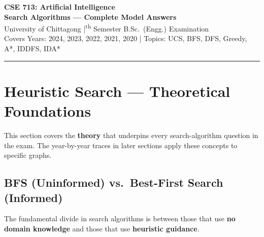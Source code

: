 \documentclass[12pt, a4paper]{article}
\begin{document}

\begin{center}
  {\LARGE\bfseries\color{sectionblue} CSE 713: Artificial Intelligence}\\[0.6em]
  {\large\bfseries Search Algorithms — Complete Model Answers}\\[0.3em]
  {\normalsize University of Chittagong \quad|\textsuperscript{th} Semester B.Sc.\ (Engg.) Examination}\\[0.2em]
  {\small Covers Years: 2024, 2023, 2022, 2021, 2020 \quad|\quad
         Topics: UCS, BFS, DFS, Greedy, A*, IDDFS, IDA*}
\end{center}

\vspace{0.3em}
\noindent\rule{\linewidth}{1pt}
\vspace{0.5em}

\tableofcontents
\newpage

\section{Heuristic Search — Theoretical Foundations}

This section covers the \textbf{theory} that underpins every search-algorithm question in the exam.
The year-by-year traces in later sections apply these concepts to specific graphs.

\subsection{BFS (Uninformed) vs.\ Best-First Search (Informed)}

\noindent The fundamental divide in search algorithms is between those that use \textbf{no domain knowledge} and those that use \textbf{heuristic guidance}.
\end{document}
